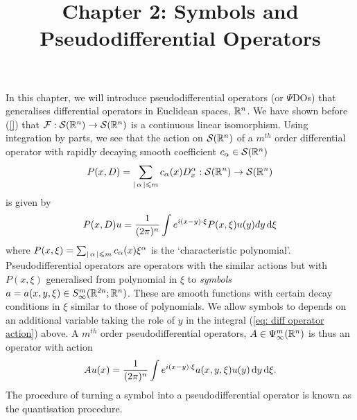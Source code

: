 \documentclass[12pt]{article}
\title{Chapter 2: Symbols and Pseudodifferential Operators}
\date{}
\begin{document}
\maketitle


In this chapter, we will introduce pseudodifferential operators (or $\Psi$DOs) that generalises differential operators in Euclidean spaces, $\R^n$. We have shown before (\ref{}) that $\F : \sch(\R^n) \to \sch(\R^n)$ is a continuous linear isomorphism. Using integration by parts, we see that the action on $\sch(\R^n)$ of a $m^{th}$ order differential operator with rapidly decaying smooth coefficient $c_\alpha \in \sch(\R^n)$ 
\begin{align}
P(x, D) = \sum_{\abs{\alpha} \leq m } c_\alpha(x) D^\alpha_x : \sch(\R^n) \to \sch(\R^n) \label{eq: general diff op} 
\end{align}
is given by 
\begin{align}
P(x, D)u = \frac{1}{(2\pi)^n} \int e^{i (x - y) \cdot \xi} P(x, \xi) u(y) dy \d[\xi]  \label{eq: diff operator action} 
\end{align}
where $P(x, \xi) = \sum_{\abs{\alpha} \leq m} c_\alpha(x) \xi^\alpha$ is the `characteristic polynomial'. \\

Pseudodifferential operators are operators with the similar actions but with $P(x, \xi)$ generalised from polynomial in $\xi$ to \textit{symbols} $a = a(x, y, \xi) \in S^m_\infty(\R^{2n}; \R^n)$. These are smooth functions with certain decay conditions in $\xi$ similar to those of polynomials. We allow symbols to depends on an additional variable taking the role of $y$ in the integral (\ref{eq: diff operator action}) above. A $m^{th}$ order pseudodifferential operators, $A \in \Psi^{m}_{\infty}(\R^n)$ is thus an operator with action 
\begin{align*}
Au(x) = \frac{1}{(2\pi)^n} \int e^{i (x - y) \cdot \xi} a(x, y, \xi) u(y) \d[y] \d[\xi]. 
\end{align*}
The procedure of turning a symbol into a pseudodifferential operator is known as the quantisation procedure. \\
\end{document}
